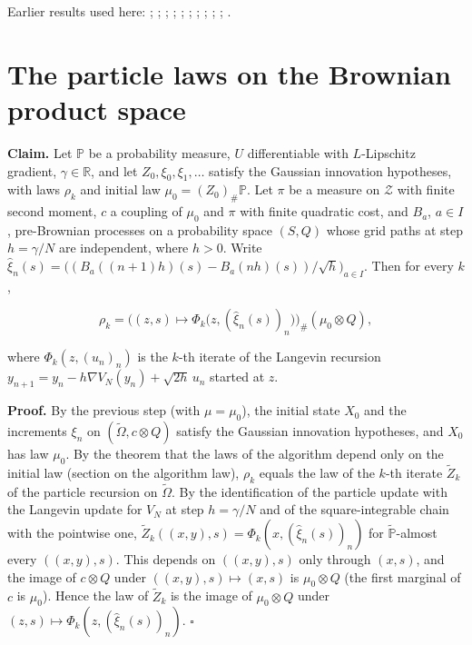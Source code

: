 \documentclass[11pt,a4paper]{article}
\begin{document}
Earlier results used here: \cite[Section~3.17.1]{LangevinLean2026ULASC}; \cite[Section~3.17.2]{LangevinLean2026ULASC}; \cite[Section~3.22.19]{LangevinLean2026ULASC}; \cite[Section~3.22.2]{LangevinLean2026ULASC}; \cite[Section~3.22.3]{LangevinLean2026ULASC}; \cite[Section~3.23.5]{LangevinLean2026ULASC}; \cite[Section~3.32.14]{LangevinLean2026ULASC}; \cite[Section~3.32.15]{LangevinLean2026ULASC}; \cite[Section~3.32.16]{LangevinLean2026ULASC}; \cite[Section~3.32.4]{LangevinLean2026ULASC}; \cite[Section~3.32.5]{LangevinLean2026ULASC}.

\section{\texorpdfstring{The particle laws on the Brownian product space}{The particle laws on the Brownian product space}}


\textbf{Claim.} Let \(\mathbb P\) be a probability measure, \(U\) differentiable with \(L\)-Lipschitz gradient, \(\gamma\in\mathbb R\), and let \(Z_0,\xi_0,\xi_1,\dots\) satisfy the Gaussian innovation hypotheses, with laws \(\rho_k\) and initial law \(\mu_0=(Z_0)_\#\mathbb P\). Let \(\pi\) be a measure on \(\mathcal Z\) with finite second moment, \(c\) a coupling of \(\mu_0\) and \(\pi\) with finite quadratic cost, and \(B_a\), \(a\in I\), pre-Brownian processes on a probability space \((S,Q)\) whose grid paths at step \(h=\gamma/N\) are independent, where \(h>0\). Write \(\hat\xi_n(s)=\bigl((B_a((n+1)h)(s)-B_a(nh)(s))/\sqrt h\bigr)_{a\in I}\). Then for every \(k\),


\[\rho_k=\bigl((z,s)\mapsto\Phi_k\bigl(z,(\hat\xi_n(s))_{n}\bigr)\bigr)_\#(\mu_0\otimes Q),\]


where \(\Phi_k(z,(u_n)_n)\) is the \(k\)-th iterate of the Langevin recursion \(y_{n+1}=y_n-h\nabla V_N(y_n)+\sqrt{2h}\,u_n\) started at \(z\).




\textbf{Proof.} By the previous step (with \(\mu=\mu_0\)), the initial state \(X_0\) and the increments \(\xi_n\) on \((\tilde\Omega,c\otimes Q)\) satisfy the Gaussian innovation hypotheses, and \(X_0\) has law \(\mu_0\). By the theorem that the laws of the algorithm depend only on the initial law (section on the algorithm law), \(\rho_k\) equals the law of the \(k\)-th iterate \(\tilde Z_k\) of the particle recursion on \(\tilde\Omega\). By the identification of the particle update with the Langevin update for \(V_N\) at step \(h=\gamma/N\) and of the square-integrable chain with the pointwise one, \(\tilde Z_k((x,y),s)=\Phi_k(x,(\hat\xi_n(s))_n)\) for \(\tilde{\mathbb P}\)-almost every \(((x,y),s)\). This depends on \(((x,y),s)\) only through \((x,s)\), and the image of \(c\otimes Q\) under \(((x,y),s)\mapsto(x,s)\) is \(\mu_0\otimes Q\) (the first marginal of \(c\) is \(\mu_0\)). Hence the law of \(\tilde Z_k\) is the image of \(\mu_0\otimes Q\) under \((z,s)\mapsto\Phi_k(z,(\hat\xi_n(s))_n)\). \(\square\)
\end{document}
